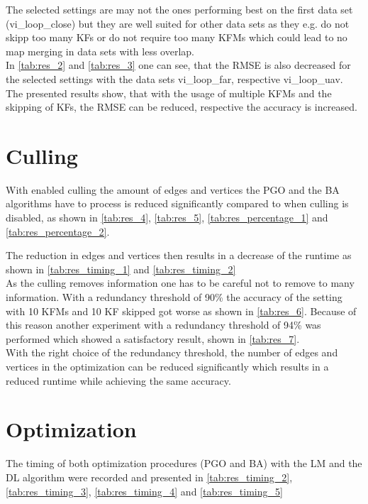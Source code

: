 The selected settings are may not the ones performing best on the first data set (vi\_loop\_close) but they are well suited for other data sets as they e.g. do not skipp too many \acp{KF} or do not require too many \acp{KFM} which could lead to no map merging in data sets with less overlap.\\

In \autoref{tab:res_2} and \autoref{tab:res_3} one can see, that the \ac{RMSE} is also decreased for the selected settings with the data sets vi\_loop\_far, respective vi\_loop\_uav.\\

The presented results show, that with the usage of multiple \acp{KFM} and the skipping of \acp{KF}, the \ac{RMSE} can be reduced, respective the accuracy is increased.

\section{Culling}

With enabled culling the amount of edges and vertices the \ac{PGO} and the \ac{BA} algorithms have to process is reduced significantly compared to when culling is disabled, as shown in \autoref{tab:res_4}, \autoref{tab:res_5}, \autoref{tab:res_percentage_1} and \autoref{tab:res_percentage_2}.

The reduction in edges and vertices then results in a decrease of the runtime as shown in \autoref{tab:res_timing_1} and \autoref{tab:res_timing_2}\\

As the culling removes information one has to be careful not to remove to many information. With a redundancy threshold of 90\% the accuracy of the setting with 10 \acp{KFM} and 10 \ac{KF} skipped got worse as shown in \autoref{tab:res_6}. Because of this reason another experiment with a redundancy threshold of 94\% was performed which showed a satisfactory result, shown in \autoref{tab:res_7}.\\

With the right choice of the redundancy threshold, the number of edges and vertices in the optimization can be reduced significantly which results in a reduced runtime while achieving the same accuracy. 

\section{Optimization}

The timing of both optimization procedures (\ac{PGO} and \ac{BA}) with the \ac{LM} and the \ac{DL} algorithm were recorded and presented in \autoref{tab:res_timing_2}, \autoref{tab:res_timing_3}, \autoref{tab:res_timing_4} and \autoref{tab:res_timing_5}

